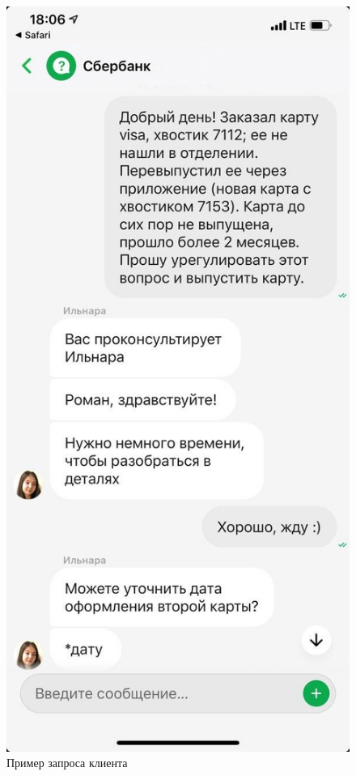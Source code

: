 \documentclass[a4paper,12pt,preview]{report} %
\begin{document}
	
	\begin{figure}
		\centering\includegraphics[scale=0.3]{input_data.jpg}
		\caption{Пример запроса клиента}
		\label{fig:input_data}
	\end{figure}
	
\end{document}
